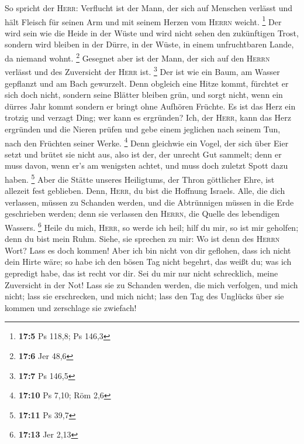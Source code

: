  So spricht der \textsc{Herr}: Verflucht ist der Mann, der
sich auf Menschen verlässt und hält Fleisch für seinen Arm und mit
seinem Herzen vom \textsc{Herrn} weicht. \footnote{\textbf{17:5} Ps
  118,8; Ps 146,3}  Der wird sein wie die Heide in der
Wüste und wird nicht sehen den zukünftigen Trost, sondern wird bleiben
in der Dürre, in der Wüste, in einem unfruchtbaren Lande, da niemand
wohnt. \footnote{\textbf{17:6} Jer 48,6}  Gesegnet aber
ist der Mann, der sich auf den \textsc{Herrn} verlässt und des
Zuversicht der \textsc{Herr} ist. \footnote{\textbf{17:7} Ps 146,5}
 Der ist wie ein Baum, am Wasser gepflanzt und am Bach
gewurzelt. Denn obgleich eine Hitze kommt, fürchtet er sich doch nicht,
sondern seine Blätter bleiben grün, und sorgt nicht, wenn ein dürres
Jahr kommt sondern er bringt ohne Aufhören Früchte.  Es
ist das Herz ein trotzig und verzagt Ding; wer kann es ergründen?
 Ich, der \textsc{Herr}, kann das Herz ergründen und die
Nieren prüfen und gebe einem jeglichen nach seinem Tun, nach den
Früchten seiner Werke. \footnote{\textbf{17:10} Ps 7,10; Röm 2,6}
 Denn gleichwie ein Vogel, der sich über Eier setzt und
brütet sie nicht aus, also ist der, der unrecht Gut sammelt; denn er
muss davon, wenn er's am wenigsten achtet, und muss doch zuletzt Spott
dazu haben. \footnote{\textbf{17:11} Ps 39,7}  Aber die
Stätte unseres Heiligtums, der Thron göttlicher Ehre, ist allezeit fest
geblieben.  Denn, \textsc{Herr}, du bist die Hoffnung
Israels. Alle, die dich verlassen, müssen zu Schanden werden, und die
Abtrünnigen müssen in die Erde geschrieben werden; denn sie verlassen
den \textsc{Herrn}, die Quelle des lebendigen Wassers. \footnote{\textbf{17:13}
  Jer 2,13}  Heile du mich, \textsc{Herr}, so werde ich
heil; hilf du mir, so ist mir geholfen; denn du bist mein Ruhm.
 Siehe, sie sprechen zu mir: Wo ist denn des
\textsc{Herrn} Wort? Lass es doch kommen!  Aber ich bin
nicht von dir geflohen, dass ich nicht dein Hirte wäre; so habe ich den
bösen Tag nicht begehrt, das weißt du; was ich gepredigt habe, das ist
recht vor dir.  Sei du mir nur nicht schrecklich, meine
Zuversicht in der Not!  Lass sie zu Schanden werden, die
mich verfolgen, und mich nicht; lass sie erschrecken, und mich nicht;
lass den Tag des Unglücks über sie kommen und zerschlage sie zwiefach!

